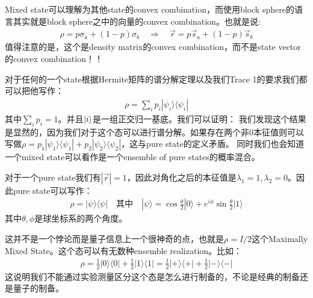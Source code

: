 \bigskip
{}

Mixed state可以理解为其他state的convex combination，而使用block
sphere的语言其实就是block sphere之中的向量的convex combination。也就是说:
\begin{align}
  \rho = p \sigma_a + (1-p) \sigma_b \quad \Rightarrow \quad \vec{r}
  = p \vec{s}_a + (1-p) \vec{s}_b
\end{align}
值得注意的是，这个是density matrix的convex combination，而不是state vector的convex combination！！

\bigskip
{}

对于任何的一个state根据Hermite矩阵的谱分解定理以及我们Trace 1的要求我们都可以把他写作：
\begin{align}
  \rho = \sum_i p_i |\psi_i\rangle\langle\psi_i|
\end{align}
其中$ \sum_i p_i = 1 $。并且$ \left| i \right\rangle $是一组正交归一基底。我们可以证明：
我们发现这个结果是显然的，因为我们对于这个态可以进行谱分解。如果存在两个非0本征值则可以写做$ \rho = p_1
|\psi_1\rangle\langle\psi_1| + p_2 |\psi_2\rangle\langle\psi_2|
$，这与pure state的定义矛盾。
同时我们也会知道一个mixed state可以看作是一个ensemble of pure states的概率混合。

\bigskip
{}

对于一个pure state我们有$ |\vec{r}| = 1 $，因此对角化之后的本征值是$ \lambda_1 = 1,
\lambda_2 = 0 $。因此pure state可以写作：
\begin{align}
  \rho = |\psi\rangle\langle\psi| \quad \text{其中} \quad |\psi\rangle
  = \cos\frac{\theta}{2}|0\rangle + e^{i\phi}\sin\frac{\theta}{2}|1\rangle
\end{align}
其中$ \theta, \phi $是球坐标系的两个角度。

\bigskip
{}

这并不是一个悖论而是量子信息上一个很神奇的点，也就是$ \rho = I/2 $这个Maximally Mixed
State。这个态可以有无数种ensemble realization。比如：
\begin{align}
  \rho = \frac{1}{2}|0\rangle\langle0| +
  \frac{1}{2}|1\rangle\langle1| = \frac{1}{2}|+\rangle\langle+| +
  \frac{1}{2}|-\rangle\langle-|
\end{align}
这说明我们不能通过实验测量区分这个态是怎么进行制备的，不论是经典的制备还是量子的制备。

